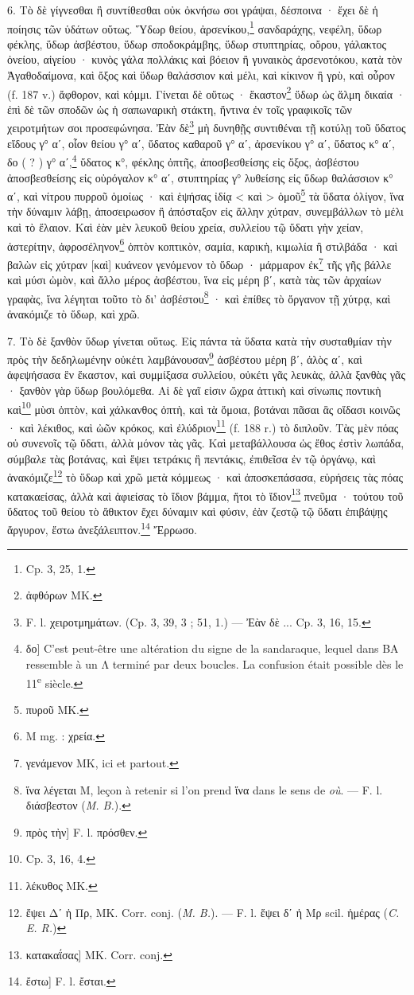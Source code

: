 \documentclass[landscape, a4paper, 11pt, oneside, polutonikogreek, french]{article}
\begin{document}
6. Τὸ δὲ γίγνεσθαι ἢ συντίθεσθαι οὐκ ὀκνήσω σοι γράψαι, δέσποινα · ἔχει δὲ ἡ ποίησις τῶν ὑδάτων οὕτως. Ὕδωρ θείου, ἀρσενίκου,\footnote{Cp. 3, 25, 1.} σανδαράχης, νεφέλη, ὕδωρ φέκλης, ὕδωρ ἀσβέστου, ὕδωρ σποδοκράμβης, ὕδωρ στυπτηρίας, οὄρου, γάλακτος ὀνείου, αἰγείου · κυνὸς γάλα πολλάκις καὶ βόειον ἢ γυναικὸς ἀρσενοτόκου, κατὰ τὸν Ἀγαθοδαίμονα, καὶ ὄξος καὶ ὕδωρ θαλάσσιον καὶ μέλι, καὶ κίκινον ἢ γρὺ, καὶ οὖρον (f. 187 v.) ἄφθορον, καὶ κόμμι. Γίνεται δὲ οὕτως · ἕκαστον\footnote{ἀφθόρων MK.} ὕδωρ ὡς ἅλμη δικαία · ἐπὶ δὲ τῶν σποδῶν ὡς ἡ σαπωναρικὴ στάκτη, ἥντινα ἐν τοῖς γραφικοῖς τῶν χειροτμήτων σοι προσεφώνησα. Ἐὰν δὲ\footnote{F. l. χειροτμημάτων. (Cp. 3, 39, 3 ; 51, 1.) --- Ἐὰν δὲ ... Cp. 3, 16, 15.} μὴ δυνηθῇς συντιθέναι τῇ κοτύλῃ τοῦ ὕδατος εἴδους γ° αʹ, οἷον θείου γ° αʹ, ὕδατος καθαροῦ γ° αʹ, ἀρσενίκου γ° αʹ, ὕδατος κ° αʹ, δο ( ? ) γ° αʹ,\footnote{δο] C'est peut-être une altération du signe de la sandaraque, lequel dans BA ressemble à un Λ terminé par deux boucles. La confusion était possible dès le 11\textsuperscript{e} siècle.} ὕδατος κ°, φέκλης ὀπτῆς, ἀποσβεσθείσης εἰς ὄξος, ἀσβέστου ἀποσβεσθείσης εἰς οὐρόγαλον κ° αʹ, στυπτηρίας γ° λυθείσης εἰς ὕδωρ θαλάσσιον κ° αʹ, καὶ νίτρου πυρροῦ ὁμοίως · καὶ ἑψήσας ἰδίᾳ < καὶ > ὁμοῦ\footnote{πυροῦ MK.} τὰ ὕδατα ὀλίγον, ἵνα τὴν δύναμιν λάβῃ, ἀποσειρωσον ἢ ἀπόσταξον εἰς ἄλλην χύτραν, συνεμβάλλων τὸ μέλι καὶ τὸ ἔλαιον. Καὶ ἐὰν μὲν λευκοῦ θείου χρεία, συλλείου τῷ ὕδατι γὴν χείαν, ἀστερίτην, ἀφροσέληνον\footnote{M mg. : χρεία.} ὀπτὸν κοπτικὸν, σαμία, καρικὴ, κιμωλία ἢ στιλβάδα · καὶ βαλὼν εἰς χύτραν [καὶ] κυάνεον γενόμενον τὸ ὕδωρ · μάρμαρον ἐκ\footnote{γενάμενον MK, ici et partout.} τῆς γῆς βάλλε καὶ μύσι ὠμὸν, καὶ ἄλλο μέρος ἀσβέστου, ἵνα εἰς μέρη βʹ, κατὰ τὰς τῶν ἀρχαίων γραφὰς, ἵνα λέγηται τοῦτο τὸ δι' ἀσβέστου\footnote{ἵνα λέγεται M, leçon à retenir si l'on prend ἵνα dans le sens de \emph{où}. --- F. l. διάσβεστον (\emph{M. B.}).} · καὶ ἐπίθες τὸ ὄργανον τῇ χύτρᾳ, καὶ ἀνακόμιζε τὸ ὕδωρ, καὶ χρῶ.

7. Τὸ δὲ ξανθὸν ὕδωρ γίνεται οὕτως. Εἰς πάντα τὰ ὕδατα κατὰ τὴν συσταθμίαν τὴν πρὸς τὴν δεδηλωμένην οὐκέτι λαμβάνουσαν\footnote{πρὸς τὴν] F. l. πρόσθεν.} ἀσβέστου μέρη βʹ, ἀλὸς αʹ, καὶ ἀφεψήσασα ἓν ἕκαστον, καὶ συμμίξασα συλλείου, οὐκέτι γᾶς λευκὰς, ἀλλὰ ξανθὰς γᾶς · ξανθὸν γὰρ ὕδωρ βουλόμεθα. Αἱ δὲ γαῖ εἰσιν ὤχρα ἀττικὴ καὶ σίνωπις ποντικὴ καὶ\footnote{Cp. 3, 16, 4.} μὺσι ὀπτὸν, καὶ χάλκανθος ὀπτὴ, καὶ τὰ ὅμοια, βοτάναι πᾶσαι ἃς οἴδασι κοινῶς · καὶ λέκιθος, καὶ ὠῶν κρόκος, καὶ ἐλύδριον\footnote{λέκυθος MK.} (f. 188 r.) τὸ διπλοῦν. Τὰς μὲν πόας οὐ συνενοῖς τῷ ὕδατι, ἀλλὰ μόνον τὰς γᾶς. Καὶ μεταβάλλουσα ὡς ἔθος ἐστὶν λωπάδα, σύμβαλε τὰς βοτάνας, καὶ ἕψει τετράκις ἢ πεντάκις, ἐπιθεῖσα ἐν τῷ ὀργάνῳ, καὶ ἀνακόμιζε\footnote{ἔψει Δʹ ἡ Πρ, MK. Corr. conj. (\emph{M. B.}). --- F. l. ἕψει δʹ ἡ Μρ scil. ἡμέρας (\emph{C. E. R.})} τὸ ὕδωρ καὶ χρῶ μετὰ κόμμεως · καὶ ἀποσκεπάσασα, εὑρήσεις τὰς πόας κατακαείσας, ἀλλὰ καὶ ἀφιείσας τὸ ἴδιον βάμμα, ἤτοι τὸ ἴδιον\footnote{κατακαΐσας] MK. Corr. conj.} πνεῦμα · τούτου τοῦ ὕδατος τοῦ θείου τὸ ἄθικτον ἔχει δύναμιν καὶ φύσιν, ἐὰν ζεστῷ τῷ ὕδατι ἐπιβάψῃς ἄργυρον, ἔστω ἀνεξάλειπτον.\footnote{ἔστω] F. l. ἔσται.} Ἔρρωσο.
\end{document}
